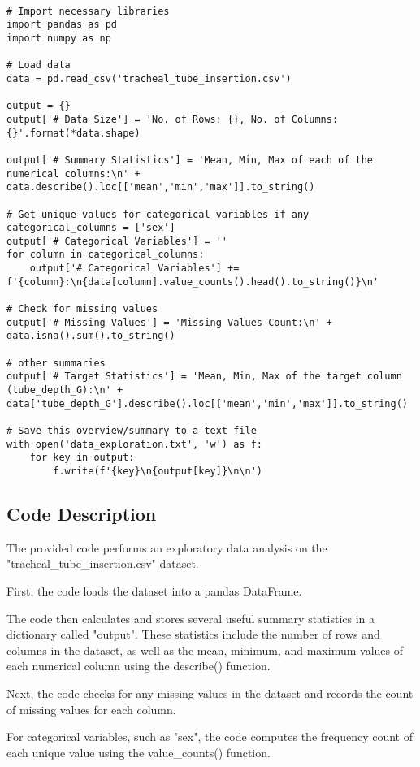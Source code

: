 \documentclass[11pt]{article}
\begin{document}
\begin{verbatim}

# Import necessary libraries
import pandas as pd
import numpy as np

# Load data
data = pd.read_csv('tracheal_tube_insertion.csv')

output = {}
output['# Data Size'] = 'No. of Rows: {}, No. of Columns: {}'.format(*data.shape)

output['# Summary Statistics'] = 'Mean, Min, Max of each of the numerical columns:\n' + data.describe().loc[['mean','min','max']].to_string()

# Get unique values for categorical variables if any
categorical_columns = ['sex']
output['# Categorical Variables'] = ''
for column in categorical_columns:
    output['# Categorical Variables'] += f'{column}:\n{data[column].value_counts().head().to_string()}\n'

# Check for missing values
output['# Missing Values'] = 'Missing Values Count:\n' + data.isna().sum().to_string()

# other summaries
output['# Target Statistics'] = 'Mean, Min, Max of the target column (tube_depth_G):\n' + data['tube_depth_G'].describe().loc[['mean','min','max']].to_string()

# Save this overview/summary to a text file
with open('data_exploration.txt', 'w') as f:
    for key in output:
        f.write(f'{key}\n{output[key]}\n\n')

\end{verbatim}

\subsection{Code Description}

The provided code performs an exploratory data analysis on the "tracheal\_tube\_insertion.csv" dataset. 

First, the code loads the dataset into a pandas DataFrame. 

The code then calculates and stores several useful summary statistics in a dictionary called "output". 
These statistics include the number of rows and columns in the dataset, as well as the mean, minimum, and maximum values of each numerical column using the describe() function.

Next, the code checks for any missing values in the dataset and records the count of missing values for each column.

For categorical variables, such as "sex", the code computes the frequency count of each unique value using the value\_counts() function.
\end{document}
